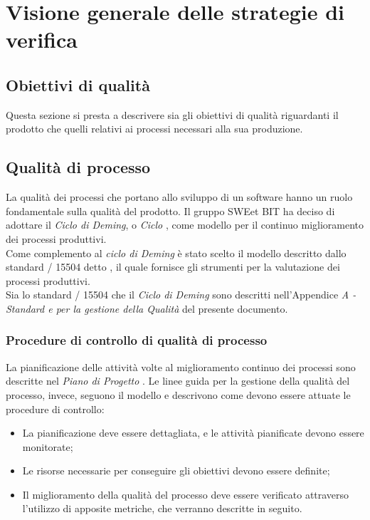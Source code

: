 \section{Visione generale delle strategie di verifica}
  \subsection{Obiettivi di qualità}
  Questa sezione si presta a descrivere sia gli obiettivi di qualità riguardanti
  il prodotto che quelli relativi ai processi necessari alla sua produzione.
  
  \subsection{Qualità di processo}
    La qualità dei processi che portano allo sviluppo di un software hanno un
    ruolo fondamentale sulla qualità del prodotto. Il gruppo SWEet BIT ha deciso
    di adottare il \emph{Ciclo di Deming}, o \emph{Ciclo} ,
    come modello per il continuo miglioramento dei processi produttivi. \\
    Come complemento al \emph{ciclo di Deming} è stato scelto il modello descritto
    dallo standard / 15504 detto
    , il quale fornisce gli strumenti per la valutazione dei
    processi produttivi.\\
    Sia lo standard / 15504 che il
    \emph{Ciclo di Deming} sono descritti nell'Appendice \emph{A - Standard e
     per la gestione della Qualità} del presente documento.

  \subsubsection{Procedure di controllo di qualità di processo}
  La pianificazione delle attività volte al miglioramento continuo dei processi
  sono descritte nel \emph{Piano di Progetto \VersionePP{}}. Le linee guida per
  la gestione della qualità del processo, invece, seguono il modello  e
  descrivono come devono essere attuate le procedure di controllo:
  \begin{itemize}
    \item La pianificazione deve essere dettagliata, e le attività pianificate
    devono essere monitorate;
    \item Le risorse necessarie per conseguire gli obiettivi devono essere
    definite;
    \item Il miglioramento della qualità del processo deve essere verificato
    attraverso l'utilizzo di apposite metriche, che verranno descritte in seguito.
  \end{itemize}
  
